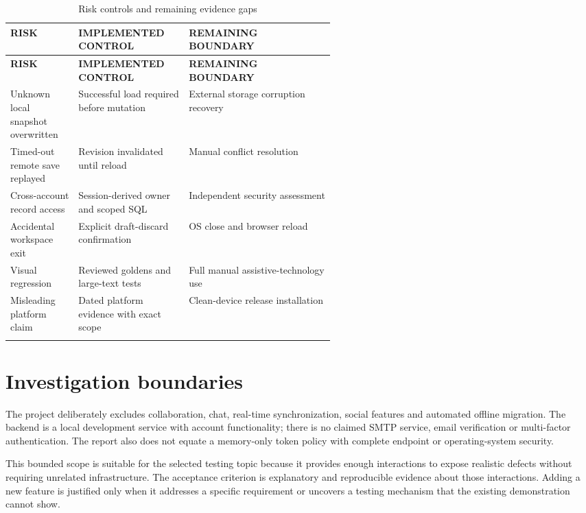\documentclass[12pt,a4paper,oneside]{report}
\begin{document}
{\fontsize{11}{14}\selectfont\setlength{\tabcolsep}{4pt}\renewcommand{\arraystretch}{1.15}
\begin{longtable}{@{}>{\raggedright\arraybackslash}p{0.21\linewidth}>{\raggedright\arraybackslash}p{0.34\linewidth}>{\raggedright\arraybackslash}p{}@{}}
\caption{Risk controls and remaining evidence gaps}\\\toprule
\textbf{RISK} & \textbf{IMPLEMENTED CONTROL} & \textbf{REMAINING BOUNDARY} \\ \midrule
\endfirsthead\toprule
\textbf{RISK} & \textbf{IMPLEMENTED CONTROL} & \textbf{REMAINING BOUNDARY} \\ \midrule
\endhead
Unknown local snapshot overwritten & Successful load required before mutation & External storage corruption recovery \\ \addlinespace[5pt]
Timed-out remote save replayed & Revision invalidated until reload & Manual conflict resolution \\ \addlinespace[5pt]
Cross-account record access & Session-derived owner and scoped SQL & Independent security assessment \\ \addlinespace[5pt]
Accidental workspace exit & Explicit draft-discard confirmation & OS close and browser reload \\ \addlinespace[5pt]
Visual regression & Reviewed goldens and large-text tests & Full manual assistive-technology use \\ \addlinespace[5pt]
Misleading platform claim & Dated platform evidence with exact scope & Clean-device release installation \\ \addlinespace[5pt]
\bottomrule\end{longtable}}
\section{Investigation boundaries}
The project deliberately excludes collaboration, chat, real-time synchronization, social features and automated offline migration. The backend is a local development service with account functionality; there is no claimed SMTP service, email verification or multi-factor authentication. The report also does not equate a memory-only token policy with complete endpoint or operating-system security.

This bounded scope is suitable for the selected testing topic because it provides enough interactions to expose realistic defects without requiring unrelated infrastructure. The acceptance criterion is explanatory and reproducible evidence about those interactions. Adding a new feature is justified only when it addresses a specific requirement or uncovers a testing mechanism that the existing demonstration cannot show.
\end{document}
